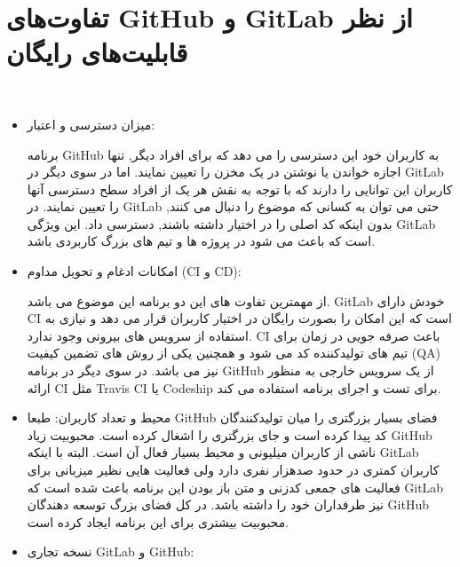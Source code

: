 
\section{تفاوت‌های GitHub و GitLab از نظر قابلیت‌های رایگان}\ \\


\begin{itemize}
\item میزان دسترسی و اعتبار: \newline

برنامه GitHub به کاربران خود این دسترسی را می دهد که برای افراد دیگر, تنها اجازه خواندن یا نوشتن در یک مخزن را تعیین نمایند. اما در سوی دیگر در GitLab کاربران این توانایی را دارند که با توجه به نقش هر یک از افراد سطح دسترسی آنها را تعیین نمایند. در GitLab حتی می توان به کسانی که موضوع را دنبال می کنند, بدون اینکه کد اصلی را در اختیار داشته باشند, دسترسی داد. این ویژگی GitLab است که باعث می شود در پروژه ها و تیم های بزرگ کاربردی باشد.

\item امکانات ادغام و تحویل مداوم (CI و CD): \newline

از مهمترین تفاوت های این دو برنامه این موضوع می باشد. GitLab خودش دارای CI است که این امکان را بصورت رایگان در اختیار کاربران قرار می دهد و نیازی به استفاده از سرویس های بیرونی وجود ندارد. CI باعث صرفه جویی در زمان برای تیم های تولیدکننده کد می شود و همچنین یکی از روش های تضمین کیفیت (QA) نیز می باشد. در سوی دیگر در برنامه GitHub از یک سرویس خارجی به منظور ارائه CI مثل Travis CI یا Codeship برای تست و اجرای برنامه استفاده می کند.

\item محیط و تعداد کاربران: \newline
طبعا GitHub فضای بسیار بزرگتری را میان تولیدکنندگان کد پیدا کرده است و جای بزرگتری را اشغال کرده است. محبوبیت زیاد GitHub ناشی از کاربران میلیونی و محیط بسیار فعال آن است. البته با اینکه GitLab کاربران کمتری در حدود صدهزار نفری دارد ولی فعالیت هایی نظیر میزبانی برای فعالیت های جمعی کدزنی و متن باز بودن این برنامه باعث شده است که GitLab نیز طرفداران خود را داشته باشد. در کل فضای بزرگ توسعه دهندگان GitHub محبوبیت بیشتری برای این برنامه ایجاد کرده است.

\item نسخه تجاری GitLab و GitHub: \newline


\end{itemize}
